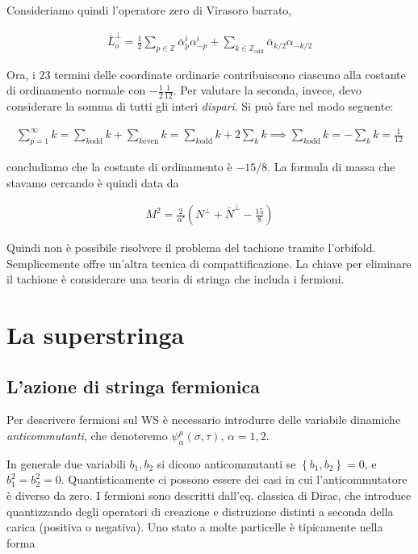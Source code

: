 \documentclass{report}
\begin{document}
Consideriamo quindi l'operatore zero di Virasoro barrato, 

\begin{align}
    \bar{L}_o^\perp = \frac{1}{2}\sum_{p \in \mathbb{Z}}\bar{\alpha}^i_p \alpha^i_{-p} + \sum_{k \in \mathbb{Z}_{\text{odd}}}\bar{\alpha}_{k/2} \alpha_{-k/2}
\end{align}

Ora, i \(23\) termini delle coordinate ordinarie contribuiscono ciascuno alla costante di ordinamento normale con \(-\frac{1}{2}\frac{1}{12}\). Per valutare la seconda, invece, devo considerare la somma di tutti gli interi \emph{dispari}. Si può fare nel modo seguente: 

\begin{align}
    \sum_{p =1}^{\infty} k = \sum_{k \text{odd}} k + \sum_{k \text{even}} k = \sum_{k \text{odd}}k + 2\sum_{k} k\implies \sum_{k \text{odd}} k  = -\sum_{k}k = \frac{1}{12}
\end{align}

concludiamo che la costante di ordinamento è \(-15/8\). La formula di massa che stavamo cercando è quindi data da 

\begin{align}
    M^2 = \frac{2}{\alpha'}(N^\perp + \bar{N}^\perp - \frac{15}{8})
\end{align}

Quindi non è possibile risolvere il problema del tachione tramite l'orbifold. Semplicemente offre un'altra tecnica di compattificazione. La chiave per eliminare il tachione è considerare una teoria di stringa che includa i fermioni. 

\chapter{La superstringa}

\section{L'azione di stringa fermionica}

Per descrivere fermioni sul WS è necessario introdurre delle variabile dinamiche \emph{anticommutanti}, che denoteremo \(\psi^\mu_\alpha (\sigma, \tau), \, \alpha = 1, 2\). 

In generale due variabili \(b_1, b_2\) si dicono anticommutanti se \(\left\{ b_1, b_2 \right\} = 0\), e \(b_1^2 = b_2^2 = 0\). Quantisticamente ci possono essere dei casi in cui l'anticommutatore è diverso da zero. I fermioni sono descritti dall'eq. classica di Dirac, che introduce quantizzando degli operatori di creazione e distruzione distinti a seconda della carica (positiva o negativa). Uno stato a molte particelle è tipicamente nella forma 
\end{document}

